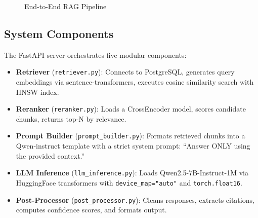 \documentclass[11pt,a4paper]{article}
\begin{document}
\begin{figure}[H]
\centering
{}
\caption{End-to-End RAG Pipeline}
\end{figure}

\subsection{System Components}

The FastAPI server orchestrates five modular components:

\begin{itemize}[noitemsep]
    \item \textbf{Retriever} (\texttt{retriever.py}): Connects to PostgreSQL,
        generates query embeddings via sentence-transformers, executes
        cosine similarity search with HNSW index.
    \item \textbf{Reranker} (\texttt{reranker.py}): Loads a CrossEncoder
        model, scores candidate chunks, returns top-N by relevance.
    \item \textbf{Prompt Builder} (\texttt{prompt\_builder.py}): Formats
        retrieved chunks into a Qwen-instruct template with a strict
        system prompt: ``Answer ONLY using the provided context.''
    \item \textbf{LLM Inference} (\texttt{llm\_inference.py}): Loads
        Qwen2.5-7B-Instruct-1M via HuggingFace transformers with
        \texttt{device\_map="auto"} and \texttt{torch.float16}.
    \item \textbf{Post-Processor} (\texttt{post\_processor.py}): Cleans
        responses, extracts citations, computes confidence scores, and
        formats output.
\end{itemize}
\end{document}
